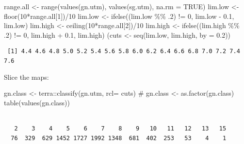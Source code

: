 \documentclass[
  letterpaper,
  DIV=11,
  numbers=noendperiod]{scrartcl}
\newenvironment{Shaded}{\begin{snugshade}}{\end{snugshade}}
\newcommand{\AttributeTok}[1]{\textcolor[rgb]{0.40,0.45,0.13}{#1}}
\newcommand{\CommentTok}[1]{\textcolor[rgb]{0.37,0.37,0.37}{#1}}
\newcommand{\ConstantTok}[1]{\textcolor[rgb]{0.56,0.35,0.01}{#1}}
\newcommand{\DecValTok}[1]{\textcolor[rgb]{0.68,0.00,0.00}{#1}}
\newcommand{\FloatTok}[1]{\textcolor[rgb]{0.68,0.00,0.00}{#1}}
\newcommand{\FunctionTok}[1]{\textcolor[rgb]{0.28,0.35,0.67}{#1}}
\newcommand{\NormalTok}[1]{\textcolor[rgb]{0.00,0.23,0.31}{#1}}
\newcommand{\OtherTok}[1]{\textcolor[rgb]{0.00,0.23,0.31}{#1}}
\newcommand{\SpecialCharTok}[1]{\textcolor[rgb]{0.37,0.37,0.37}{#1}}
\begin{document}
\begin{Shaded}
\begin{Highlighting}[]
\NormalTok{range.all }\OtherTok{\textless{}{-}} \FunctionTok{range}\NormalTok{(}\FunctionTok{values}\NormalTok{(gn.utm),}
                   \FunctionTok{values}\NormalTok{(sg.utm),}
                   \AttributeTok{na.rm =} \ConstantTok{TRUE}\NormalTok{)}
\NormalTok{lim.low }\OtherTok{\textless{}{-}} \FunctionTok{floor}\NormalTok{(}\DecValTok{10}\SpecialCharTok{*}\NormalTok{range.all[}\DecValTok{1}\NormalTok{])}\SpecialCharTok{/}\DecValTok{10}
\NormalTok{lim.low }\OtherTok{\textless{}{-}} \FunctionTok{ifelse}\NormalTok{((lim.low }\SpecialCharTok{\%\%}\NormalTok{ .}\DecValTok{2}\NormalTok{) }\SpecialCharTok{!=} \DecValTok{0}\NormalTok{, lim.low }\SpecialCharTok{{-}} \FloatTok{0.1}\NormalTok{, lim.low)}
\NormalTok{lim.high }\OtherTok{\textless{}{-}} \FunctionTok{ceiling}\NormalTok{(}\DecValTok{10}\SpecialCharTok{*}\NormalTok{range.all[}\DecValTok{2}\NormalTok{])}\SpecialCharTok{/}\DecValTok{10}
\NormalTok{lim.high }\OtherTok{\textless{}{-}} \FunctionTok{ifelse}\NormalTok{((lim.high }\SpecialCharTok{\%\%}\NormalTok{ .}\DecValTok{2}\NormalTok{) }\SpecialCharTok{!=} \DecValTok{0}\NormalTok{, lim.high }\SpecialCharTok{+} \FloatTok{0.1}\NormalTok{, lim.high)}
\NormalTok{(cuts }\OtherTok{\textless{}{-}} \FunctionTok{seq}\NormalTok{(lim.low, lim.high, }\AttributeTok{by =} \FloatTok{0.2}\NormalTok{))}
\end{Highlighting}
\end{Shaded}

\begin{verbatim}
 [1] 4.4 4.6 4.8 5.0 5.2 5.4 5.6 5.8 6.0 6.2 6.4 6.6 6.8 7.0 7.2 7.4 7.6
\end{verbatim}

Slice the maps:

\begin{Shaded}
\begin{Highlighting}[]
\NormalTok{gn.class }\OtherTok{\textless{}{-}}\NormalTok{ terra}\SpecialCharTok{::}\FunctionTok{classify}\NormalTok{(gn.utm, }\AttributeTok{rcl=}\NormalTok{ cuts)}
\CommentTok{\# gn.class \textless{}{-} as.factor(gn.class)}
\FunctionTok{table}\NormalTok{(}\FunctionTok{values}\NormalTok{(gn.class))}
\end{Highlighting}
\end{Shaded}

\begin{verbatim}

   2    3    4    5    6    7    8    9   10   11   12   13   15 
  76  329  629 1452 1727 1992 1348  681  402  253   53    4    1 
\end{verbatim}
\end{document}
